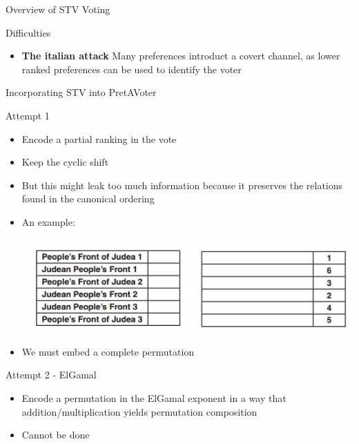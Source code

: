 \documentclass{beamer}
\begin{document}
\begin{frame}[allowframebreaks]{Overview of STV Voting}
\begin{block}{Difficulties}
\begin{itemize}
\item \textbf{The italian attack} Many preferences introduct a covert channel, as lower ranked preferences can be used to identify the voter
\end{itemize}
\end{block}

\end{frame}

\begin{frame}[allowframebreaks]{Incorporating STV into PretAVoter \cite{heather2007implementing}}
\begin{block}{Attempt 1}
\begin{itemize}
\item Encode a partial ranking in the vote
\item Keep the cyclic shift
\item But this might leak too much information because it preserves the relations found in the canonical ordering
\item An example:
\begin{center}
\includegraphics[scale=0.5]{stv.jpg}
\end{center}
\item We must embed a complete permutation
\end{itemize}
\end{block}

\begin{block}{Attempt 2 - ElGamal}
\begin{itemize}
\item Encode a permutation in the ElGamal exponent in a way that addition/multiplication yields permutation composition
\item Cannot be done
\end{itemize}
\end{block}


\end{frame}
\end{document}

